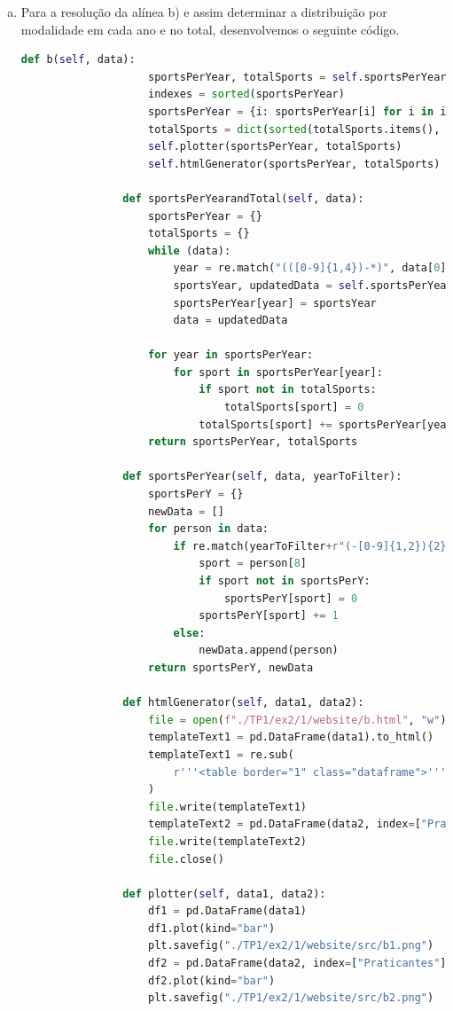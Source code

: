 \documentclass[11pt,a4paper]{report}%
\begin{document}
\begin{enumerate}
\begin{enumerate}[a)]
		\newpage
		
		\item Para a resolução da alínea b) e assim determinar a distribuição por modalidade em cada ano e no total, desenvolvemos o seguinte código.\\
		\begin{lstlisting}[language=python]	
				def b(self, data):
					sportsPerYear, totalSports = self.sportsPerYearandTotal(data)
					indexes = sorted(sportsPerYear)
					sportsPerYear = {i: sportsPerYear[i] for i in indexes}
					totalSports = dict(sorted(totalSports.items(), key=lambda x: x[1]))
					self.plotter(sportsPerYear, totalSports)
					self.htmlGenerator(sportsPerYear, totalSports)
				
				def sportsPerYearandTotal(self, data):
					sportsPerYear = {}
					totalSports = {}
					while (data):
						year = re.match("(([0-9]{1,4})-*)", data[0][2]).group(2)
						sportsYear, updatedData = self.sportsPerYear(data, year)
						sportsPerYear[year] = sportsYear
						data = updatedData
				
					for year in sportsPerYear:
						for sport in sportsPerYear[year]:
							if sport not in totalSports:
								totalSports[sport] = 0
							totalSports[sport] += sportsPerYear[year][sport]
					return sportsPerYear, totalSports
				
				def sportsPerYear(self, data, yearToFilter):
					sportsPerY = {}
					newData = []
					for person in data:
						if re.match(yearToFilter+r"(-[0-9]{1,2}){2}", person[2]):
							sport = person[8]
							if sport not in sportsPerY:
								sportsPerY[sport] = 0
							sportsPerY[sport] += 1
						else:
							newData.append(person)
					return sportsPerY, newData
				
				def htmlGenerator(self, data1, data2):
					file = open(f"./TP1/ex2/1/website/b.html", "w")
					templateText1 = pd.DataFrame(data1).to_html()
					templateText1 = re.sub( 
						r'''<table border="1" class="dataframe">''', '''<h1 class="title">Distribuição por modalidade em cada ano e no total</h1>\n<div class="images" style="display: flex; width: 100%; padding-bottom: 2rem;"><img src="./src/b1.png" alt="" style="width:50%">\n<img src="./src/b2.png" alt="" style="width:50%">\n</div>\n<link rel="stylesheet" href="./main.css">\n<table border="1" class="dataframe">''', templateText1
					)
					file.write(templateText1)
					templateText2 = pd.DataFrame(data2, index=["Praticantes"]).to_html()
					file.write(templateText2)
					file.close()
				
				def plotter(self, data1, data2):
					df1 = pd.DataFrame(data1)
					df1.plot(kind="bar")
					plt.savefig("./TP1/ex2/1/website/src/b1.png")
					df2 = pd.DataFrame(data2, index=["Praticantes"])
					df2.plot(kind="bar")
					plt.savefig("./TP1/ex2/1/website/src/b2.png")
		\end{lstlisting}
		

\end{enumerate}
\end{enumerate}
\end{document}
